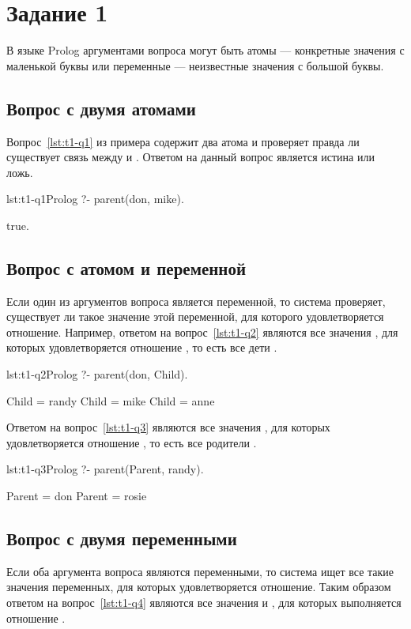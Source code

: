 \section{Задание 1}
В языке Prolog аргументами вопроса могут быть атомы --- конкретные значения 
с маленькой буквы или переменные --- неизвестные значения с большой буквы.

\subsection{Вопрос с двумя атомами}
Вопрос~\ref{lst:t1-q1} из примера содержит два атома и проверяет правда ли существует
связь  между  и . Ответом на данный вопрос является 
истина или ложь.
\begin{listing}{lst:t1-q1}{Prolog}
?- parent(don, mike).

true.
\end{listing}

\subsection{Вопрос с атомом и переменной}
Если один из аргументов вопроса является переменной, то система проверяет, существует
ли такое значение этой переменной, для которого удовлетворяется отношение.
Например, ответом на вопрос~\ref{lst:t1-q2} являются все значения , для которых удовлетворяется 
отношение , то есть все дети .
\begin{listing}{lst:t1-q2}{Prolog}
?- parent(don, Child).

Child = randy 
Child = mike 
Child = anne
\end{listing}

Ответом на вопрос~\ref{lst:t1-q3} являются все значения , для которых удовлетворяется 
отношение , то есть все родители .
\begin{listing}{lst:t1-q3}{Prolog}
?- parent(Parent, randy).

Parent = don
Parent = rosie
\end{listing}

\subsection{Вопрос с двумя переменными}
Если оба аргумента вопроса являются переменными, то система ищет все такие значения 
переменных, для которых удовлетворяется отношение. Таким образом ответом на 
вопрос~\ref{lst:t1-q4} являются все значения  и , для которых
выполняется отношение .

